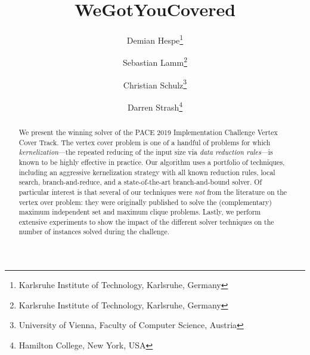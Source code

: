 \documentclass[twoside,leqno,twocolumn]{article}
\newcommand{\mytitle}{WeGotYouCovered}
\begin{document}
\title{\mytitle}
\author{Demian Hespe\thanks{Karlsruhe Institute of Technology, Karlsruhe, Germany} \and Sebastian Lamm\thanks{Karlsruhe Institute of Technology, Karlsruhe, Germany} \and Christian Schulz\thanks{University of Vienna, Faculty of Computer Science, Austria} \and Darren Strash\thanks{Hamilton College, New York, USA}}


\date{}


\maketitle
\begin{abstract}
We present the winning solver of the PACE 2019 Implementation Challenge Vertex Cover Track. The vertex cover problem is one of a handful of problems for which \emph{kernelization}---the repeated reducing of the input size via \emph{data reduction rules}---is known to be highly effective in practice. Our algorithm uses a portfolio of techniques, including an aggressive kernelization strategy with all known reduction rules, local search, branch-and-reduce, and a state-of-the-art branch-and-bound solver. Of particular interest is that several of our techniques were \emph{not} from the literature on the vertex over problem: they were originally published to solve the (complementary) maximum independent set and maximum clique problems. Lastly, we perform extensive experiments to show the impact of the different solver techniques on the number of instances solved during the challenge.
\end{abstract}

\end{document}
